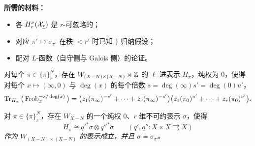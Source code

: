 \par\medskip
\noindent\textbf{所需的材料：}

\begin{itemize}
\item 各 $H^\nu_c(\cX_{\ul{r}})$ 是 $r$-可忽略的；
\item 对应 $\pi' \mapsto \sigma_{\pi'}$ 在秩 $< r'$ 时已知 \quad $\Big\}$ 归纳假设；
\item 配对 $L$-函数（自守侧与 Galois 侧）的论证。
\end{itemize}

\begin{corollary*}
对每个 $\pi \in \{\pi\}^N_r$，存在 $W_{(X-N)\times(X-N)} \rtimes \mathbb{Z}$ 的 $\ell$-进表示 $H_\pi$，纯权为 $0$，使得对每个 $x \mapsto (\infty, 0)$ 与 $\deg(x)$ 的每个倍数 $s = \deg(\infty)s' = \deg(0)u'$，
\[ \operatorname{Tr}_{H_\pi}\big(\operatorname{Frob}_x^{-s/\deg(x)}\big) = \big(z_1(\pi_\infty)^{-s'} + \cdots + z_r(\pi_\infty)^{-s'}\big)\big(z_1(\pi_0)^{u'} + \cdots + z_r(\pi_0)^{u'}\big). \]
\end{corollary*}

\begin{theorem*}
对 $\pi \in \{\pi\}^N_r$，存在 $W_{X-N}$ 的一个纯权 $0$、$r$ 维不可约表示 $\sigma$，使得
\[ H_\pi \cong q'^*\sigma \otimes q''^*\check{\sigma} \qquad (q', q'' : X \times X \rightrightarrows X) \]
\emph{作为 $W_{(X-N)\times(X-N)}$ 的表示成立，并且 $\sigma = \sigma_\pi$。}
\end{theorem*}
